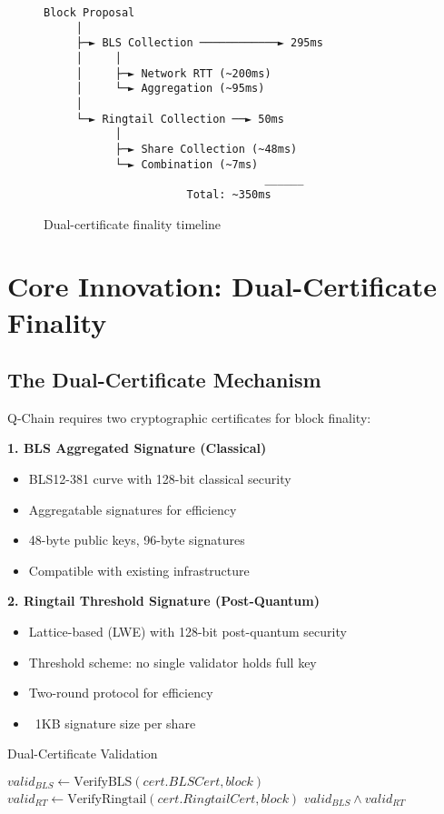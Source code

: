 \documentclass[11pt]{article}
\begin{document}
\begin{figure}[h]
\centering
\begin{verbatim}
Block Proposal
     │
     ├─► BLS Collection ────────────► 295ms
     │     │
     │     ├─► Network RTT (~200ms)
     │     └─► Aggregation (~95ms)
     │
     └─► Ringtail Collection ──► 50ms
           │
           ├─► Share Collection (~48ms)
           └─► Combination (~7ms)
                                  ______
                      Total: ~350ms
\end{verbatim}
\caption{Dual-certificate finality timeline}
\label{fig:dual-cert}
\end{figure}

\section{Core Innovation: Dual-Certificate Finality}

\subsection{The Dual-Certificate Mechanism}

Q-Chain requires two cryptographic certificates for block finality:

\textbf{1. BLS Aggregated Signature (Classical)}
\begin{itemize}
\item BLS12-381 curve with 128-bit classical security
\item Aggregatable signatures for efficiency
\item 48-byte public keys, 96-byte signatures
\item Compatible with existing infrastructure
\end{itemize}

\textbf{2. Ringtail Threshold Signature (Post-Quantum)}
\begin{itemize}
\item Lattice-based (LWE) with 128-bit post-quantum security
\item Threshold scheme: no single validator holds full key
\item Two-round protocol for efficiency
\item ~1KB signature size per share
\end{itemize}

\begin{algorithm}[H]
\caption{Dual-Certificate Validation}
\begin{algorithmic}[1]
    \State $valid_{BLS} \gets \text{VerifyBLS}(cert.BLSCert, block)$
    \State $valid_{RT} \gets \text{VerifyRingtail}(cert.RingtailCert, block)$
    \State \Return $valid_{BLS} \land valid_{RT}$
\EndFunction
\end{algorithmic}
\end{algorithm}
\end{document}
